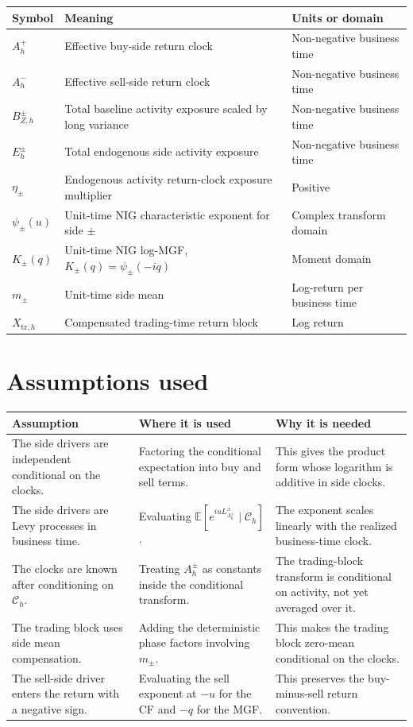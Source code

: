 \documentclass[11pt]{article}
\begin{document}
\begin{tabularx}{\textwidth}{lXX}
\toprule
Symbol & Meaning & Units or domain\\
\midrule
\(A_h^+\) & Effective buy-side return clock & Non-negative business time\\
\(A_h^-\) & Effective sell-side return clock & Non-negative business time\\
\(B_{Z,h}^\pm\) & Total baseline activity exposure scaled by long variance & Non-negative business time\\
\(E_h^\pm\) & Total endogenous side activity exposure & Non-negative business time\\
\(\eta_\pm\) & Endogenous activity return-clock exposure multiplier & Positive\\
\(\psi_\pm(u)\) & Unit-time NIG characteristic exponent for side \(\pm\) & Complex transform domain\\
\(K_\pm(q)\) & Unit-time NIG log-MGF, \(K_\pm(q)=\psi_\pm(-iq)\) & Moment domain\\
\(m_\pm\) & Unit-time side mean & Log-return per business time\\
\(X_{\mathrm{tr},h}\) & Compensated trading-time return block & Log return\\
\bottomrule
\end{tabularx}

\section{Assumptions used}

\begin{tabularx}{\textwidth}{XXX}
\toprule
Assumption & Where it is used & Why it is needed\\
\midrule
The side drivers are independent conditional on the clocks.
& Factoring the conditional expectation into buy and sell terms.
& This gives the product form whose logarithm is additive in side clocks.\\
The side drivers are Levy processes in business time.
& Evaluating \(\mathbb E[e^{iuL_{A_h^\pm}^\pm}\mid\mathcal C_h]\).
& The exponent scales linearly with the realized business-time clock.\\
The clocks are known after conditioning on \(\mathcal C_h\).
& Treating \(A_h^\pm\) as constants inside the conditional transform.
& The trading-block transform is conditional on activity, not yet averaged over it.\\
The trading block uses side mean compensation.
& Adding the deterministic phase factors involving \(m_\pm\).
& This makes the trading block zero-mean conditional on the clocks.\\
The sell-side driver enters the return with a negative sign.
& Evaluating the sell exponent at \(-u\) for the CF and \(-q\) for the MGF.
& This preserves the buy-minus-sell return convention.\\
\bottomrule
\end{tabularx}
\end{document}
